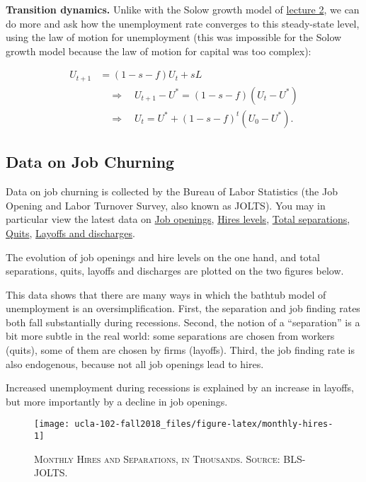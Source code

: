 \documentclass[]{book}
\theoremstyle{definition}
\theoremstyle{definition}
\theoremstyle{definition}
\theoremstyle{remark}
\begin{document}
\textbf{Transition dynamics.} Unlike with the Solow growth model of
\href{lecture2.html}{lecture 2}, we can do more and ask how the
unemployment rate converges to this steady-state level, using the law of
motion for unemployment (this was impossible for the Solow growth model
because the law of motion for capital was too complex):

\[
\begin{aligned}
U_{t+1}&=\left(1-s-f\right)U_{t}+sL\\
& \quad\Rightarrow\quad U_{t+1}-U^{*}=\left(1-s-f\right)\left(U_{t}-U^{*}\right)\\
    & \quad\Rightarrow\quad U_{t}=U^{*}+\left(1-s-f\right)^{t}\left(U_{0}-U^{*}\right).
\end{aligned}
\]

\subsection{Data on Job Churning}\label{data-on-job-churning}

Data on job churning is collected by the Bureau of Labor Statistics (the
Job Opening and Labor Turnover Survey, also known as JOLTS). You may in
particular view the latest data on
\href{https://www.bls.gov/news.release/jolts.t01.htm}{Job openings},
\href{https://www.bls.gov/news.release/jolts.t02.htm}{Hires levels},
\href{https://www.bls.gov/news.release/jolts.t03.htm}{Total
separations},
\href{https://www.bls.gov/news.release/jolts.t04.htm}{Quits},
\href{https://www.bls.gov/news.release/jolts.t05.htm}{Layoffs and
discharges}.

The evolution of job openings and hire levels on the one hand, and total
separations, quits, layoffs and discharges are plotted on the two
figures below.

This data shows that there are many ways in which the bathtub model of
unemployment is an oversimplification. First, the separation and job
finding rates both fall substantially during recessions. Second, the
notion of a ``separation'' is a bit more subtle in the real world: some
separations are chosen from workers (quits), some of them are chosen by
firms (layoffs). Third, the job finding rate is also endogenous, because
not all job openings lead to hires.

Increased unemployment during recessions is explained by an increase in
layoffs, but more importantly by a decline in job openings.




\begin{figure}

{\centering \texttt{[image: ucla-102-fall2018\_files/figure-latex/monthly-hires-1]} 

}

\caption{\textsc{Monthly Hires and Separations, in Thousands.
Source: BLS-JOLTS}.}\label{fig:monthly-hires}
\end{figure}
\end{document}
